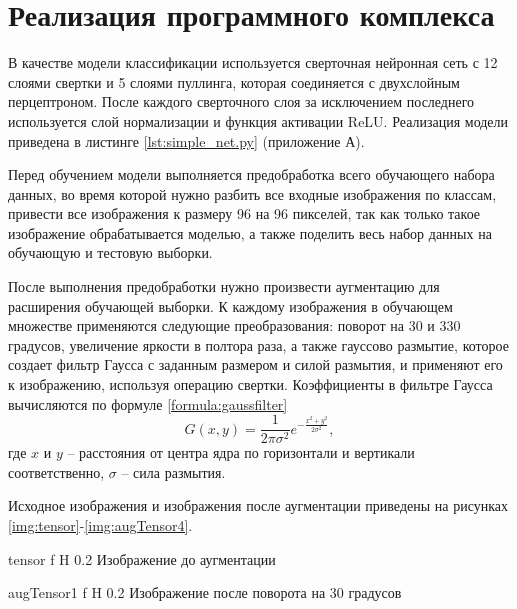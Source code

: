 \section{Реализация программного комплекса}

В качестве модели классификации используется сверточная нейронная сеть с 12 слоями свертки и 5 слоями пуллинга, которая соединяется с двухслойным перцептроном. После каждого сверточного слоя за исключением последнего используется слой нормализации и функция активации ReLU. Реализация модели приведена в листинге \ref{lst:simple_net.py} (приложение А).

Перед обучением модели выполняется предобработка всего обучающего набора данных, во время которой нужно разбить все входные изображения по классам, привести все изображения к размеру 96 на 96 пикселей, так как только такое изображение обрабатывается моделью, а также поделить весь набор данных на обучающую и тестовую выборки.

После выполнения предобработки нужно произвести аугментацию для расширения обучающей выборки. К каждому изображения в обучающем множестве применяются следующие преобразования: поворот на 30 и 330 градусов, увеличение яркости в полтора раза, а также гауссово размытие, которое создает фильтр Гаусса с заданным размером и силой размытия, и применяют его к изображению, используя операцию свертки. Коэффициенты в фильтре Гаусса вычисляются по формуле \ref{formula:gaussfilter}
\begin{equation}\label{formula:gaussfilter}
G(x,y) = \frac{1}{2\pi\sigma^2}e^{-\frac{x^2+y^2}{2\sigma^2}},
\end{equation}
где $x$ и $y$ -- расстояния от центра ядра по горизонтали и вертикали соответственно, $\sigma$ -- сила размытия.

Исходное изображения и изображения после аугментации приведены на рисунках \ref{img:tensor}-\ref{img:augTensor4}.

{tensor} %
{f} %
{H} %
{0.2\textwidth} %
{Изображение до аугментации} %

{augTensor1} %
{f} %
{H} %
{0.2\textwidth} %
{Изображение после поворота на 30 градусов} %

